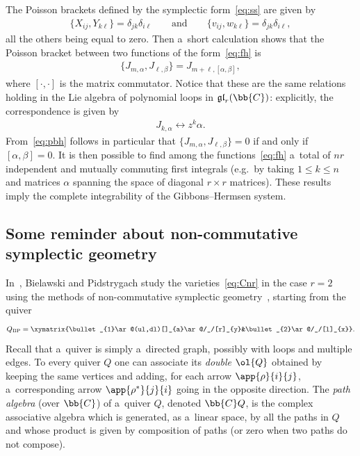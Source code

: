 The Poisson brackets def\/ined by the symplectic form~\eqref{eq:ss} are given by
\begin{gather*}%
\{X_{ij},Y_{k\ell}\}=\delta_{jk}\delta_{i\ell}
\qquad
\text{and}
\qquad
\{v_{ij},w_{k\ell}\}=\delta_{jk}\delta_{i\ell},
\end{gather*}
all the others being equal to zero.
Then a~short calculation shows that the Poisson bracket between two functions of the form~\eqref{eq:fh} is
\begin{gather}
\label{eq:pbh}
\{J_{m,\alpha},J_{\ell,\beta}\}=J_{m+\ell,[\alpha,\beta]},
\end{gather}
where $[\cdot,\cdot]$ is the matrix commutator.
Notice that these are the same relations holding in the Lie algebra of polynomial loops in
$\mathfrak{gl}_r(\bb{C})$: explicitly, the correspondence is given by
\begin{gather}
\label{eq:corr}
J_{k,\alpha}\leftrightarrow z^{k}\alpha.
\end{gather}
From~\eqref{eq:pbh} follows in particular that \(\{J_{m,\alpha}, J_{\ell,\beta}\} = 0\) if and only if
\([\alpha,\beta] = 0\).
It is then possible to f\/ind among the functions~\eqref{eq:fh} a~total of \(nr\) independent and mutually
commuting f\/irst integrals (e.g.\
by taking \(1\leq k\leq n\) and matrices \(\alpha\) spanning the space of diagonal \(r\times r\) matrices).
These results imply the complete integrability of the Gibbons--Hermsen system.

\subsection{Some reminder about non-commutative symplectic geometry}

In~\cite{bp08}, Bielawski and Pidstrygach study the varieties~\eqref{eq:Cnr} in the case \(r=2\) using the methods
of non-commutative symplectic geometry~\cite{blb02, ginz01}, starting from the quiver
\begin{gather}
\label{eq:quiv-bp}
Q_{\mathrm{BP}}=\xymatrix{\bullet_{1}\ar@(ul,dl)[]_{a}\ar@/_/[r]_{y}&\bullet_{2}\ar@/_/[l]_{x}}.
\end{gather}
Recall that a~quiver is simply a~directed graph, possibly with loops and multiple edges.
To every quiver \(Q\) one can associate its \emph{double} \(\ol{Q}\) obtained by keeping the same vertices
and adding, for each arrow \(\app{\rho}{i}{j}\), a~corresponding arrow \(\app{\rho^{*}}{j}{i}\) going in
the opposite direction.
The \emph{path algebra} (over \(\bb{C}\)) of a~quiver \(Q\), denoted \(\bb{C}Q\), is the complex
associative algebra which is generated, as a~linear space, by all the paths in \(Q\) and whose product is
given by composition of paths (or zero when two paths do not compose).

